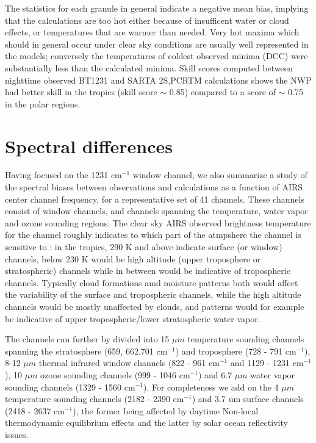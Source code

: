 \documentclass[agupp]{aguplus}              %
\newcommand{\wn}{cm$^{-1}$\xspace}
\newcommand{\um}{$\mu m$\xspace}
\begin{document}
\begin{article}
The statistics for each granule in general indicate a negative mean
bias, implying that the calculations are too hot either because of
insufficent water or cloud effects, or temperatures that are warmer
than needed.  Very hot maxima which should in general occur under
clear sky conditions are usually well represented in the models;
conversely the temperatures of coldest observed minima (DCC) were
substantially less than the calculated minima. Skill scores computed
between nighttime observed BT1231 and SARTA 2S,PCRTM calculations
shows the NWP had better skill in the tropics (skill score $\sim$
0.85) compared to a score of $\sim$ 0.75 in the polar regions.

\section{Spectral differences}

Having focused on the 1231 \wn window channel, we also summarize a
study of the spectral biases between observations and calculations as
a function of AIRS center channel frequency, for a representative set
of 41 channels. These channels consist of window channels, and
channels spanning the temperature, water vapor and ozone sounding
regions. The clear sky AIRS observed brightness temperature for the
channel roughly indicates to which part of the atmpshere the channel
is sensitive to : in the tropics, 290 K and above indicate surface (or
window) channels, below 230 K would be high altitude (upper
troposphere or stratospheric) channels while in between would be
indicative of tropospheric channels. Typically cloud formations amd
moisture patterns both would affect the variability of the surface and
tropospheric channels, while the high altitude channels would be
mostly unaffected by clouds, and patterns would for example be
indicative of upper tropospheric/lower stratospheric water vapor.

The channels can further by divided into 15 \um temperature sounding
channels spanning the stratosphere (659, 662,701 \wn) and troposphere
(728 - 791 \wn), 8-12 \um thermal infrared window channels (822 - 961
\wn and 1129 - 1231 \wn), 10 \um ozone sounding channels (999 - 1046
\wn) and 6.7 \um water vapor sounding channels (1329 - 1560 \wn).  For
completeness we add on the 4 \um temperature sounding channels (2182 -
2390 \wn) and 3.7 um surface channels (2418 - 2637 \wn), the former
being affected by daytime Non-local thermodynamic equilibrium effects
\citep{mac:06*1} and the latter by solar ocean reflectivity
issues. 


\end{article}
\end{document}
